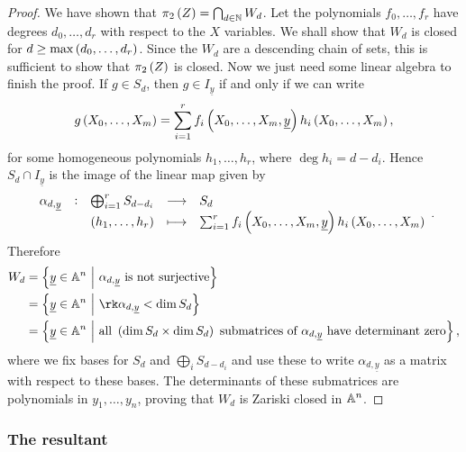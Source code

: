 \begin{proof}
We have shown that $ \pi_2\br{Z} = \bigcap_{d \in \NN} W_d $. Let the polynomials $ f_0, \dots, f_r $ have degrees $ d_0, \dots, d_r $ with respect to the $ X $ variables. We shall show that $ W_d $ is closed for $ d \ge \max\br{d_0, \dots, d_r} $. Since the $ W_d $ are a descending chain of sets, this is sufficient to show that $ \pi_2\br{Z} $ is closed. Now we just need some linear algebra to finish the proof. If $ g \in S_d $, then $ g \in I_{\underline{y}} $ if and only if we can write
$$ g\br{X_0, \dots, X_m} = \sum_{i = 1}^r f_i\br{X_0, \dots, X_m, \underline{y}}h_i\br{X_0, \dots, X_m}, $$
for some homogeneous polynomials $ h_1, \dots, h_r $, where $ \deg h_i = d - d_i $. Hence $ S_d \cap I_{\underline{y}} $ is the image of the linear map given by
$$ \function[\alpha_{d, \underline{y}}]{\bigoplus_{i = 1}^r S_{d - d_i}}{S_d}{\br{h_1, \dots, h_r}}{\sum_{i = 1}^r f_i\br{X_0, \dots, X_m, \underline{y}}h_i\br{X_0, \dots, X_m}}. $$
Therefore
\begin{align*}
W_d
& = \cbr{\underline{y} \in \AA^n \st \alpha_{d, \underline{y}} \ \text{is not surjective}} \\
& = \cbr{\underline{y} \in \AA^n \st \rk \alpha_{d, \underline{y}} < \dim S_d} \\
& = \cbr{\underline{y} \in \AA^n \st \text{all} \ \br{\dim S_d \times \dim S_d} \ \text{submatrices of} \ \alpha_{d, \underline{y}} \ \text{have determinant zero}},
\end{align*}
where we fix bases for $ S_d $ and $ \bigoplus_i S_{d - d_i} $ and use these to write $ \alpha_{d, \underline{y}} $ as a matrix with respect to these bases. The determinants of these submatrices are polynomials in $ y_1, \dots, y_n $, proving that $ W_d $ is Zariski closed in $ \AA^n $.
\end{proof}

\subsubsection{The resultant}

